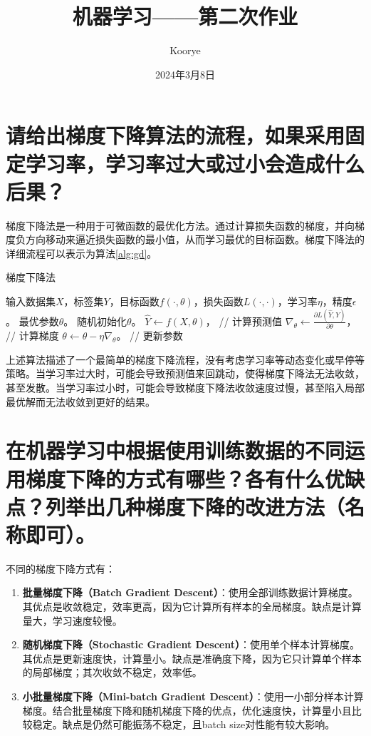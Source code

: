\documentclass{article}
\title{机器学习——第二次作业}
\author{Koorye}
\date{2024年3月8日}
\begin{document}
\maketitle
\thispagestyle{fancy}

\section{请给出梯度下降算法的流程，如果采用固定学习率，学习率过大或过小会造成什么后果？}

梯度下降法是一种用于可微函数的最优化方法。通过计算损失函数的梯度，并向梯度负方向移动来逼近损失函数的最小值，从而学习最优的目标函数。梯度下降法的详细流程可以表示为算法\ref{alg:gd}。

\begin{algorithm}
    \caption{梯度下降法}
    \label{alg:gd}
    \begin{algorithmic}[1]
        \Require 输入数据集$X$，标签集$Y$，目标函数$f(\cdot,\theta)，$损失函数$L(\cdot,\cdot)$，学习率$\eta$，精度$\epsilon$。
        \Ensure 最优参数$\theta$。
        \State 随机初始化$\theta$。
            \State $\hat{Y}\gets f(X,\theta)$， // 计算预测值
            \State $\nabla_\theta\gets\frac{\partial L(\hat{Y},Y)}{\partial\theta}$， // 计算梯度
            \State $\theta\gets\theta-\eta\nabla_{\theta}$。 // 更新参数
        \EndWhile
    \end{algorithmic}
\end{algorithm}

上述算法描述了一个最简单的梯度下降流程，没有考虑学习率等动态变化或早停等策略。当学习率过大时，可能会导致预测值来回跳动，使得梯度下降法无法收敛，甚至发散。当学习率过小时，可能会导致梯度下降法收敛速度过慢，甚至陷入局部最优解而无法收敛到更好的结果。

\section{在机器学习中根据使用训练数据的不同运用梯度下降的方式有哪些？各有什么优缺点？列举出几种梯度下降的改进方法（名称即可）。}

不同的梯度下降方式有：
\begin{enumerate}
    \item \textbf{批量梯度下降（Batch Gradient Descent）}：使用全部训练数据计算梯度。其优点是收敛稳定，效率更高，因为它计算所有样本的全局梯度。缺点是计算量大，学习速度较慢。
    \item \textbf{随机梯度下降（Stochastic Gradient Descent）}：使用单个样本计算梯度。其优点是更新速度快，计算量小。缺点是准确度下降，因为它只计算单个样本的局部梯度；其次收敛不稳定，效率低。
    \item \textbf{小批量梯度下降（Mini-batch Gradient Descent）}：使用一小部分样本计算梯度。结合批量梯度下降和随机梯度下降的优点，优化速度快，计算量小且比较稳定。缺点是仍然可能振荡不稳定，且batch size对性能有较大影响。
\end{enumerate}
\end{document}
